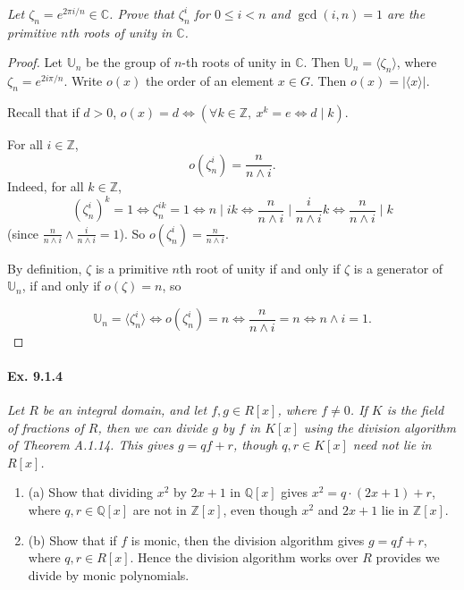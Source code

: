 \documentclass[11pt,a4paper]{article}
\newcommand{\be} {\begin{enumerate}}
\newcommand{\ee} {\end{enumerate}}
\newcommand{\Q}{\mathbb{Q}}
\newcommand{\Z}{\mathbb{Z}}
\newcommand{\C}{\mathbb{C}}
\newcommand{\U}{\mathbb{U}}
\begin{document}
{\it Let $\zeta_n = e^{2\pi i/n} \in \C$. Prove that $\zeta_n^i$ for $0\leq i <n$ and $\gcd(i,n) = 1$ are the primitive $n$th roots of unity in $\C$.
}

\begin{proof}
Let $\U_n$ be the group of $n$-th roots of unity in $\C$. Then $\U_n = \langle \zeta_n \rangle$, where $\zeta_n = e^{2i\pi/n}$. Write $o(x)$ the order of an element $x\in G$. Then $o(x)= \vert \langle x \rangle \vert$.

Recall that if $d>0$, $o(x)= d \iff (\forall k \in \Z,\  x^k = e \iff d \mid k)$.

For all $i \in \Z$,
$$o(\zeta_n^i)=\frac{n}{n\wedge i}.$$
Indeed, for all $k\in\Z$,
$$(\zeta_n ^i)^k = 1 \iff \zeta_n^{ik} = 1 \iff n \mid ik \iff \frac{n}{n\wedge i} \mid \frac{i}{n\wedge i} k \iff  \frac{n}{n\wedge i} \mid k$$
(since $\frac{n}{n\wedge i} \wedge \frac{i}{n\wedge i} = 1$).
So $o(\zeta_n^i)=\frac{n}{n\wedge i}$.

By definition, $\zeta$ is a primitive $n$th root of unity if and only if $\zeta$ is a generator of $\U_n$, if and only if $o(\zeta)= n$, so

$$\U_n = \langle \zeta_n^i \rangle \iff o(\zeta_n^i)= n \iff \frac{n}{n\wedge i} = n \iff n \wedge i = 1.$$
\end{proof}

\paragraph{Ex. 9.1.4}

{\it Let $R$ be an integral domain, and let $f,g\in R[x]$, where $f\ne 0$. If $K$ is the field of fractions of $R$, then we can divide $g$ by $f$ in $K[x]$ using the division algorithm of Theorem A.1.14. This gives $g = qf+r$, though $q,r \in K[x]$ need not lie in $R[x]$.
\be
\item[(a)] Show that dividing $x^2$ by $2x+1$ in $\Q[x]$ gives $x^2 = q\cdot (2x+1) + r$, where $q,r \in \Q[x]$ are not in $\Z[x]$, even though $x^2$ and $2x+1$ lie in $\Z[x]$.
\item[(b)] Show that if $f$ is monic, then the division algorithm gives $g=qf+r$, where $q,r \in R[x]$. Hence the division algorithm works over $R$ provides we divide by monic polynomials. 
\ee
}
\end{document}
